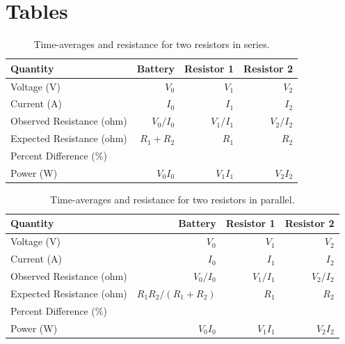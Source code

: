 \section{Tables}
%
\begin{table}[ht]
	\begin{center}
		\begin{tabular}{l|r|r|r}
            \textbf{Quantity} & \textbf{Battery} & \textbf{Resistor 1} & \textbf{Resistor 2} \\
            \hline
            Voltage (V) & $V_{0}$ & $V_{1}$ & $V_{2}$ \\
            Current (A) & $I_{0}$ & $I_{1}$ & $I_{2}$ \\
            \hline
            Observed Resistance (ohm) & $V_{0} / I_{0}$ & $V_{1} / I_{1}$ & $V_{2} / I_{2}$ \\
            Expected Resistance (ohm) & $R_{1} + R_{2}$ & $R_{1}$ & $R_{2}$ \\
            Percent Difference (\%) & & & \\
            \hline
            Power (W) & $V_{0} I_{0}$ & $V_{1} I_{1}$ & $V_{2} I_{2}$ \\
            \hline
        \end{tabular}
	\end{center}
	\caption{Time-averages and resistance for two resistors in series.}
	\label{table.03.resistors.series}
\end{table}
%
\begin{table}[ht]
	\begin{center}
		\begin{tabular}{l|r|r|r}
            \textbf{Quantity} & \textbf{Battery} & \textbf{Resistor 1} & \textbf{Resistor 2} \\
            \hline
            Voltage (V) & $V_{0}$ & $V_{1}$ & $V_{2}$ \\
            Current (A) & $I_{0}$ & $I_{1}$ & $I_{2}$ \\
            \hline
            Observed Resistance (ohm) & $V_{0} / I_{0}$ & $V_{1} / I_{1}$ & $V_{2} / I_{2}$ \\
            Expected Resistance (ohm) & $R_{1} R_{2} / (R_{1} + R_{2})$ & $R_{1}$ & $R_{2}$ \\
            Percent Difference (\%) & & & \\
            \hline
            Power (W) & $V_{0} I_{0}$ & $V_{1} I_{1}$ & $V_{2} I_{2}$ \\
            \hline
        \end{tabular}
	\end{center}
	\caption{Time-averages and resistance for two resistors in parallel.}
	\label{table.03.resistors.parallel}
\end{table}
